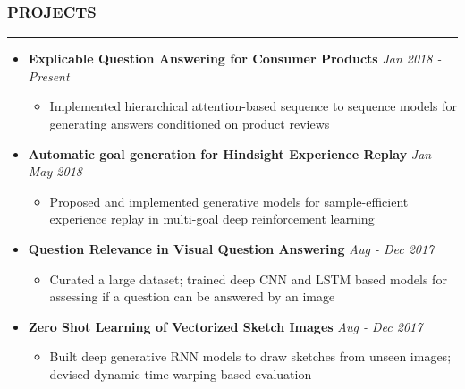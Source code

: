 \documentclass[10pt,a4paper,English]{article}
\newcommand\roottitle[1]{\vspace{-4mm}\subsubsection*{\uppercase{#1}}\vspace{-0.3em}\nopagebreak[4]\hrule\vspace{4mm}}
\newcommand\itemyear[1]{\hfill \emph{\color{itemyear} #1}}
\newcommand\itemenv{\setlength\itemsep{0.5pt} \addtolength{\itemindent}{-5mm}\vspace{-1.5mm}}
\begin{document}
\roottitle{Projects}
\begin{itemize} \itemenv
    \item \textbf{Explicable Question Answering for Consumer Products}\itemyear{Jan 2018 - Present}
        \begin{itemize} \itemenv
            \item Implemented hierarchical attention-based sequence to sequence models for generating answers conditioned on product reviews
        \end{itemize}
    
    \item \textbf{Automatic goal generation for Hindsight Experience Replay}\itemyear{Jan - May 2018}
        \begin{itemize} \itemenv
            \item Proposed and implemented generative models for sample-efficient experience replay in multi-goal deep reinforcement learning
        \end{itemize}

    \item \textbf{Question Relevance in Visual Question Answering}\itemyear{Aug - Dec 2017}
        \begin{itemize} \itemenv
            \item Curated a large dataset; trained deep CNN and LSTM based models for assessing if a question can be answered by an image
        \end{itemize}

    \item \textbf{Zero Shot Learning of Vectorized Sketch Images}\itemyear{Aug - Dec 2017}
        \begin{itemize} \itemenv
            \item Built deep generative RNN models to draw sketches from unseen images; devised dynamic time warping based evaluation
        \end{itemize}


\end{itemize}
\end{document}
